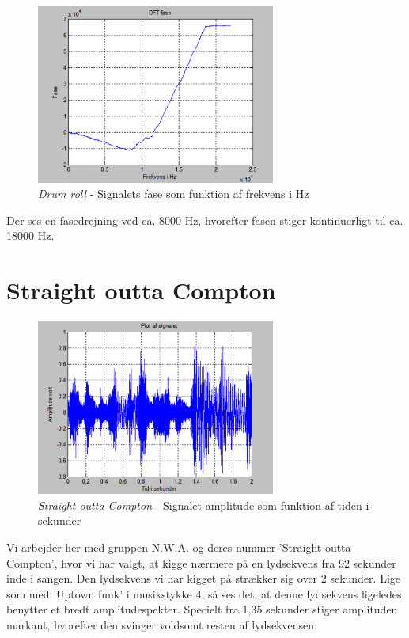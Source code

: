 \begin{figure}[H]
	\centering
	\includegraphics[width=0.7\textwidth]{Figurer/Snip20151001_15}
	\caption{\textit{Drum roll} - Signalets fase som funktion af frekvens i Hz}
\end{figure} 

Der ses en fasedrejning ved ca. 8000 Hz, hvorefter fasen stiger kontinuerligt til ca. 18000 Hz.

\section{Straight outta Compton}

\begin{figure}[H]
	\centering
	\includegraphics[width=0.7\textwidth]{Figurer/Snip20151001_16}
	\caption{\textit{Straight outta Compton} - Signalet amplitude som funktion af tiden i sekunder}
\end{figure}

Vi arbejder her med gruppen N.W.A. og deres nummer 'Straight outta Compton', hvor vi har valgt, at kigge nærmere på en lydsekvens fra 92 sekunder inde i sangen. Den lydsekvens vi har kigget på strækker sig over 2 sekunder. Lige som med 'Uptown funk' i musikstykke 4, så ses det, at denne lydsekvens ligeledes benytter et bredt amplitudespekter. Specielt fra 1,35 sekunder stiger amplituden markant, hvorefter den svinger voldsomt resten af lydsekvensen.

